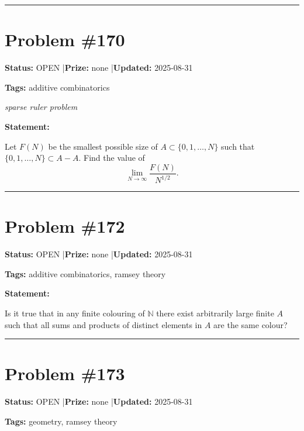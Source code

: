 \documentclass{article}
\begin{document}
\noindent\rule{\linewidth}{0.4pt}


\section{Problem \#170}
\label{prob:170}

\noindent\textbf{Status:} OPEN \quad|\quad \textbf{Prize:} none \quad|\quad \textbf{Updated:} 2025-08-31

\noindent\textbf{Tags:} additive combinatorics

\medskip
\noindent\textit{sparse ruler problem}


\noindent\textbf{Statement:}

Let $F(N)$ be the smallest possible size of $A\subset \{0,1,\ldots,N\}$ such that $\{0,1,\ldots,N\}\subset A-A$. Find the value of\[\lim_{N\to \infty}\frac{F(N)}{N^{1/2}}.\]

\noindent\rule{\linewidth}{0.4pt}


\section{Problem \#172}
\label{prob:172}

\noindent\textbf{Status:} OPEN \quad|\quad \textbf{Prize:} none \quad|\quad \textbf{Updated:} 2025-08-31

\noindent\textbf{Tags:} additive combinatorics, ramsey theory

\medskip

\noindent\textbf{Statement:}

Is it true that in any finite colouring of $\mathbb{N}$ there exist arbitrarily large finite $A$ such that all sums and products of distinct elements in $A$ are the same colour?

\noindent\rule{\linewidth}{0.4pt}


\section{Problem \#173}
\label{prob:173}

\noindent\textbf{Status:} OPEN \quad|\quad \textbf{Prize:} none \quad|\quad \textbf{Updated:} 2025-08-31

\noindent\textbf{Tags:} geometry, ramsey theory

\medskip
\end{document}
